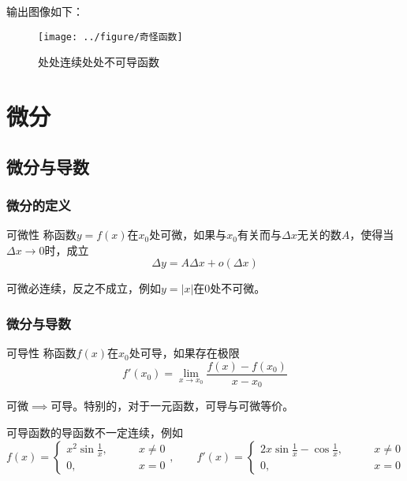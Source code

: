 \documentclass[lang = cn, scheme = chinese, thmcnt = section]{elegantbook}
\begin{document}
输出图像如下：

\begin{figure}[H]
	\centering
	\texttt{[image: ../figure/奇怪函数]}
	\caption{处处连续处处不可导函数}
\end{figure}

\chapter{微分}

\section{微分与导数}

\subsection{微分的定义}

\begin{definition}{可微性}
	称函数$y=f(x)$在$x_0$处可微，如果与$x_0$有关而与$\Delta x$无关的数$A$，使得当$\Delta x\to 0$时，成立
	$$
	\Delta y
	=A\Delta x+o(\Delta x)
	$$
\end{definition}

\begin{note}
	可微必连续，反之不成立，例如$y=|x|$在$0$处不可微。
\end{note}

\subsection{微分与导数}

\begin{definition}{可导性}
	称函数$f(x)$在$x_0$处可导，如果存在极限
	$$
	f'(x_0)=\lim_{x\to x_0}\frac{f(x)-f(x_0)}{x-x_0}
	$$
\end{definition}

\begin{theorem}
	可微$\implies$可导。特别的，对于一元函数，可导与可微等价。
\end{theorem}

\begin{note}
	可导函数的导函数不一定连续，例如
	$$
	f(x)=\begin{cases}
		x^2\sin\frac{1}{x},\qquad & x\ne 0\\
		0,\qquad & x=0
	\end{cases},\qquad 
	f'(x)=\begin{cases}
		2x\sin\frac{1}{x}-\cos\frac{1}{x},\qquad & x\ne 0\\
		0,\qquad & x=0
	\end{cases}
	$$
\end{note}
\end{document}
